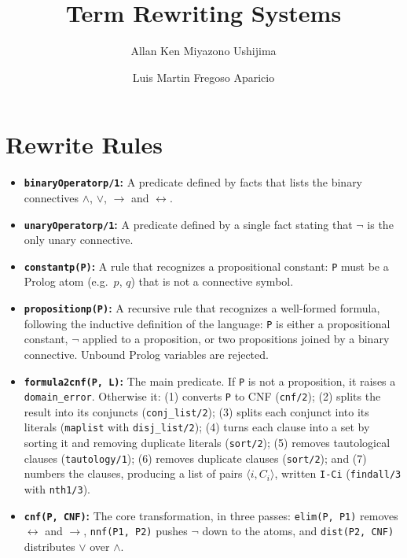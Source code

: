 \documentclass[11pt]{article}
\title{Term Rewriting Systems}
\author{Allan Ken Miyazono Ushijima \and Luis Martin Fregoso Aparicio}
\date{}
\begin{document}
\maketitle
\section{Rewrite Rules}
\begin{itemize}
    \item \textbf{\texttt{binaryOperatorp/1}:} A predicate defined by facts that lists
    the binary connectives $\land$, $\lor$, $\rightarrow$ and $\leftrightarrow$.

    \item \textbf{\texttt{unaryOperatorp/1}:} A predicate defined by a single fact
    stating that $\neg$ is the only unary connective.

    \item \textbf{\texttt{constantp(P)}:} A rule that recognizes a propositional
    constant: \texttt{P} must be a Prolog atom (e.g.\ $p$, $q$) that is not a
    connective symbol.

    \item \textbf{\texttt{propositionp(P)}:} A recursive rule that recognizes a
    well-formed formula, following the inductive definition of the language:
    \texttt{P} is either a propositional constant, $\neg$ applied to a proposition,
    or two propositions joined by a binary connective. Unbound Prolog variables
    are rejected.

    \item \textbf{\texttt{formula2cnf(P, L)}:} The main predicate. If \texttt{P} is
    not a proposition, it raises a \texttt{domain\_error}. Otherwise it:
    (1) converts \texttt{P} to CNF (\texttt{cnf/2});
    (2) splits the result into its conjuncts (\texttt{conj\_list/2});
    (3) splits each conjunct into its literals (\texttt{maplist} with \texttt{disj\_list/2});
    (4) turns each clause into a set by sorting it and removing duplicate literals (\texttt{sort/2});
    (5) removes tautological clauses (\texttt{tautology/1});
    (6) removes duplicate clauses (\texttt{sort/2}); and
    (7) numbers the clauses, producing a list of pairs $\langle i, C_i \rangle$,
    written \texttt{I-Ci} (\texttt{findall/3} with \texttt{nth1/3}).

    \item \textbf{\texttt{cnf(P, CNF)}:} The core transformation, in three passes:
    \texttt{elim(P, P1)} removes $\leftrightarrow$ and $\rightarrow$,
    \texttt{nnf(P1, P2)} pushes $\neg$ down to the atoms, and
    \texttt{dist(P2, CNF)} distributes $\lor$ over $\land$.


\end{itemize}
\end{document}
